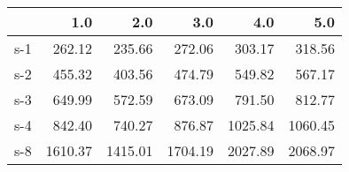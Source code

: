 \begin{tabular}{lrrrrr}
\toprule
{} &     1.0 &     2.0 &     3.0 &     4.0 &     5.0 \\
\midrule
s-1 &  262.12 &  235.66 &  272.06 &  303.17 &  318.56 \\
s-2 &  455.32 &  403.56 &  474.79 &  549.82 &  567.17 \\
s-3 &  649.99 &  572.59 &  673.09 &  791.50 &  812.77 \\
s-4 &  842.40 &  740.27 &  876.87 & 1025.84 & 1060.45 \\
s-8 & 1610.37 & 1415.01 & 1704.19 & 2027.89 & 2068.97 \\
\bottomrule
\end{tabular}
